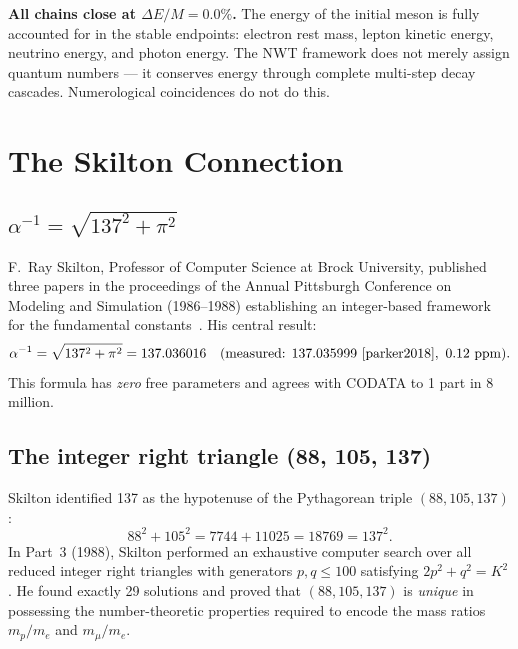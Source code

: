 \documentclass[11pt,a4paper]{article}
\begin{document}
\textbf{All chains close at $\Delta E/M = 0.0\%$.} The energy of the initial meson is fully accounted for in the stable endpoints: electron rest mass, lepton kinetic energy, neutrino energy, and photon energy. The NWT framework does not merely assign quantum numbers --- it conserves energy through complete multi-step decay cascades. Numerological coincidences do not do this.

\section{The Skilton Connection}
\label{sec:skilton}

\subsection{\texorpdfstring{$\alpha^{-1} = \sqrt{137^2 + \pi^2}$}{alpha inverse = sqrt(137 squared + pi squared)}}

F.~Ray Skilton, Professor of Computer Science at Brock University, published three papers in the proceedings of the Annual Pittsburgh Conference on Modeling and Simulation (1986--1988) establishing an integer-based framework for the fundamental constants~\cite{skilton1986,skilton1987,skilton1988}. His central result:
\begin{equation}
  \alpha^{-1} = \sqrt{137^2 + \pi^2} = 137.036016 \quad (\text{measured: } 137.035999~\cite{parker2018},\ 0.12~\text{ppm}).
  \label{eq:skilton-alpha}
\end{equation}
This formula has \emph{zero} free parameters and agrees with CODATA to 1 part in 8 million.

\subsection{The integer right triangle (88, 105, 137)}

Skilton identified 137 as the hypotenuse of the Pythagorean triple $(88, 105, 137)$:
\begin{equation}
  88^2 + 105^2 = 7744 + 11025 = 18769 = 137^2.
\end{equation}
In Part~3 (1988), Skilton performed an exhaustive computer search over all reduced integer right triangles with generators $p, q \leq 100$ satisfying $2p^2 + q^2 = K^2$. He found exactly 29 solutions and proved that $(88, 105, 137)$ is \emph{unique} in possessing the number-theoretic properties required to encode the mass ratios $m_p/m_e$ and $m_\mu/m_e$.
\end{document}
